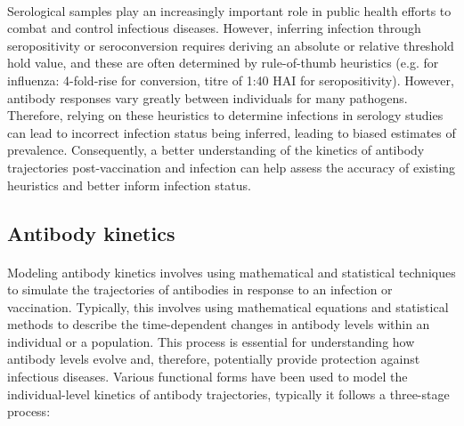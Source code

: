 \paragraph{}Serological samples play an increasingly important role in public health efforts to combat and control infectious diseases.\cite{Haselbeck2022-ob,Metcalf2016-tr} However, inferring infection through seropositivity or seroconversion requires deriving an absolute or relative threshold hold value, and these are often determined by rule-of-thumb heuristics (e.g. for influenza: 4-fold-rise for conversion, titre of 1:40 HAI for seropositivity).\cite{Xu2021-pz} However, antibody responses vary greatly between individuals for many pathogens. Therefore, relying on these heuristics to determine infections in serology studies can lead to incorrect infection status being inferred, leading to biased estimates of prevalence.\cite{Chan2021-me,Cauchemez2012-ui} Consequently, a better understanding of the kinetics of antibody trajectories post-vaccination and infection can help assess the accuracy of existing heuristics and better inform infection status.

\subsection{Antibody kinetics}

\paragraph{}Modeling antibody kinetics involves using mathematical and statistical techniques to simulate the trajectories of antibodies in response to an infection or vaccination.\cite{Hay2023-ty} Typically, this involves using mathematical equations and statistical methods to describe the time-dependent changes in antibody levels within an individual or a population. This process is essential for understanding how antibody levels evolve and, therefore, potentially provide protection against infectious diseases. Various functional forms have been used to model the individual-level kinetics of antibody trajectories,\cite{Garcia-Fogeda2023-yc, Ranjeva2019-go, Hay2019-xu, Srivastava2023-of,Zhao2018-op,Teunis2016-wh} typically it follows a three-stage process:

